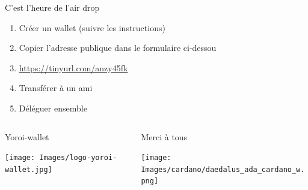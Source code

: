\documentclass{beamer}
\begin{document}
\begin{frame}[label={sec:org0d82882}]{C'est l'heure de l'air drop}
  \begin{enumerate}
  \item Créer un wallet (suivre les instructions)
  \item Copier l'adresse publique dans le formulaire ci-dessou
  \item \url{https://tinyurl.com/anzy45fk}
  \item Transférer à un ami
  \item Déléguer ensemble
  \end{enumerate}

  \begin{columns}
    \begin{column}{0.40\columnwidth}
      \begin{block}{Yoroi-wallet}
        \begin{center}
          \texttt{[image: Images/logo-yoroi-wallet.jpg]}
        \end{center}
      \end{block}
    \end{column}
    \begin{column}{0.4\columnwidth}
      \begin{block}{Merci à tous}
        \begin{center}
          \texttt{[image: Images/cardano/daedalus\_ada\_cardano\_w.png]}
        \end{center}
      \end{block}
    \end{column}
  \end{columns}
\end{frame}
\end{document}
